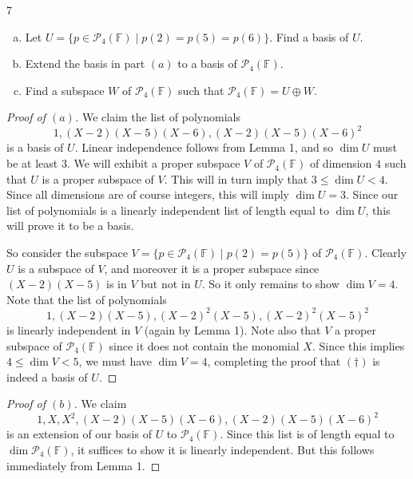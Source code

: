 \documentclass{extarticle}
\newenvironment{problem}[1]{\begin{prob*}{#1}{}}{\end{prob*}}
\newcommand{\F}{\mathbb{F}}
\begin{document}
\begin{problem}{7}
\begin{enumerate}[(a)]
\item Let $U=\{p\in\mathcal{P}_4(\F)\mid p(2)=p(5)=p(6)\}$.  Find a basis of $U$.
\item Extend the basis in part $(a)$ to a basis of $\mathcal{P}_4(\F)$.
\item Find a subspace $W$ of $\mathcal{P}_4(\F)$ such that $\mathcal{P}_4(\F)=U\oplus W$.
\end{enumerate}
\end{problem}
\begin{proof}[Proof of $(a)$]
We claim the list of polynomials
\begin{equation}\tag{$\dagger$}
1, (X - 2)(X-5)(X-6), (X-2)(X-5)(X-6)^2
\end{equation}
is a basis of $U$.  Linear independence follows from Lemma 1, and so $\dim U$ must be at least $3$.  We will exhibit a proper subspace $V$ of $\mathcal{P}_4(\F)$ of dimension $4$ such that $U$ is a proper subspace of $V$.  This will in turn imply that $3\leq \dim U < 4$.  Since all dimensions are of course integers, this will imply $\dim U=3$.  Since our list of polynomials is a linearly independent list of length equal to $\dim U$, this will prove it to be a basis.
\par So consider the subspace $V = \{p\in\mathcal{P}_4(\F)\mid p(2)=p(5)\}$ of $\mathcal{P}_4(\F)$.  Clearly $U$ is a subspace of $V$, and moreover it is a proper subspace since $(X-2)(X-5)$ is in $V$ but not in $U$.  So it only remains to show $\dim V = 4$.  Note that the list of polynomials
\begin{equation*}
1, (X-2)(X-5), (X-2)^2(X-5), (X-2)^2(X-5)^2
\end{equation*}
is linearly independent in $V$ (again by Lemma 1).   Note also that $V$ a proper subspace of $\mathcal{P}_4(\F)$ since it does not contain the monomial $X$.  Since this implies $4\leq \dim V < 5$, we must have $\dim V = 4$, completing the proof that $(\dagger)$ is indeed a basis of $U$.
\end{proof}
\begin{proof}[Proof of $(b)$]
We claim 
\begin{equation*}
1, X, X^2, (X - 2)(X-5)(X-6), (X-2)(X-5)(X-6)^2
\end{equation*}
is an extension of our basis of $U$ to $\mathcal{P}_4(\F)$.  Since this list is of length equal to $\dim\mathcal{P}_4(\F)$, it suffices to show it is linearly independent.  But this follows immediately from Lemma 1.
\end{proof}
\end{document}

